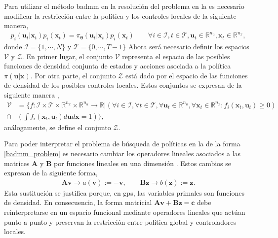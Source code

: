 Para utilizar el método \acrshort{badmm} en la resolución del problema en la  es necesario modificar la restricción entre la política y los controles locales de la siguiente manera,
\begin{align}
p_i(\mathbf{u}_t|\mathbf{x}_t)p_i(\mathbf{x}_t)= \pi_{\bm\theta}(\mathbf{u}_t|\mathbf{x}_t)p_i(\mathbf{x}_t) \qquad 
    \forall i \in \mathcal{I}, t \in \mathcal{T}, \mathbf{u}_t\in \mathbb{R}^{n_u}, \mathbf{x}_t \in \mathbb{R}^{n_x}, 
\end{align}
donde $\mathcal{I}=\{1, \cdots, N\}$ y $\mathcal{T}=\{0, \cdots, T-1\}$
Ahora será necesario definir los espacios $\mathcal{V}$ y $\mathcal{Z}$. En primer lugar, el conjunto $\mathcal{V}$ representa el espacio de las posibles funciones de densidad conjunta de estados y acciones asociada a la política $\pi(\mathbf{u}|\mathbf{x})$. Por otra parte, el conjunto $\mathcal{Z}$ está dado por el espacio de las funciones de densidad de los posibles controles locales. Estos conjuntos se expresan de la siguiente manera \cite{Schneider2018},
\begin{equation}
\begin{aligned}
     \mathcal{V}&=\Bigg\{ f:\mathcal{I}\times\mathcal{T}\times\mathbb{R}^{n_x}\times\mathbb{R}^{n_u}\rightarrow\mathbb{R}\Big| \left( \forall i \in \mathcal{I},\forall t \in \mathcal{T}, \forall \mathbf{u}_t\in \mathbb{R}^{n_u}, \forall\mathbf{x}_t\in \mathbb{R}^{n_x}:f_i(\mathbf{x}_t, \mathbf{u}_t)\geq 0 \right)   \\ 
    \cap & \left(\int f_i(\mathbf{x}_t, \mathbf{u}_t)d\mathbf{u}d\mathbf{x} =1\right)\Bigg\},
\end{aligned}
\end{equation}
análogamente, se define el conjunto $\mathcal{Z}$.

Para poder interpretar el problema de búsqueda de políticas en la  de la forma \ref{badmm_problem} es necesario 
cambiar los operadores lineales asociados a las matrices $\mathbf{A}$ y $\mathbf{B}$ por funciones lineales en una dimensión \cite{Schneider2018}. Estos cambios se expresan de la siguiente forma, 
\begin{align}
\mathbf{A}\mathbf{v} \rightarrow a(\mathbf{v}):= -\mathbf{v}, \qquad
\mathbf{B}\mathbf{z} \rightarrow b(\mathbf{z}):= \mathbf{z}.
\end{align}
Esta sustitución se justifica porque, en \acrshort{gps}, las variables primales son funciones de densidad. En consecuencia, la forma matricial $\mathbf{A}\mathbf{v}+\mathbf{B}\mathbf{z}=\mathbf{c}$ debe reinterpretarse en un espacio funcional mediante operadores lineales que actúan punto a punto y preservan la restricción entre política global y controladores locales.

